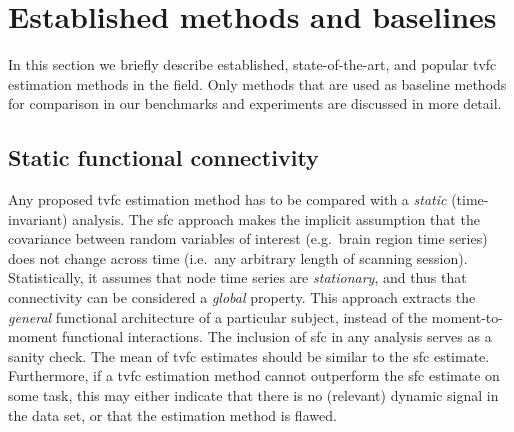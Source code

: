 \clearpage
\section{Established methods and baselines}
\label{sec:established-methods}

In this section we briefly describe established, state-of-the-art, and popular \gls{tvfc} estimation methods in the field.
Only methods that are used as baseline methods for comparison in our benchmarks and experiments are discussed in more detail.

\subsection{Static functional connectivity}

Any proposed \gls{tvfc} estimation method has to be compared with a \emph{static} (time-invariant) analysis.
The \gls{sfc} approach makes the implicit assumption that the covariance between random variables of interest (e.g.~brain region time series) does not change across time (i.e.~any arbitrary length of scanning session).
Statistically, it assumes that node time series are \emph{stationary}, and thus that connectivity can be considered a \emph{global} property.
This approach extracts the \emph{general} functional architecture of a particular subject, instead of the moment-to-moment functional interactions.
%
The inclusion of \gls{sfc} in any analysis serves as a sanity check.
The mean of \gls{tvfc} estimates should be similar to the \gls{sfc} estimate.
Furthermore, if a \gls{tvfc} estimation method cannot outperform the \gls{sfc} estimate on some task, this may either indicate that there is no (relevant) dynamic signal in the data set, or that the estimation method is flawed.

